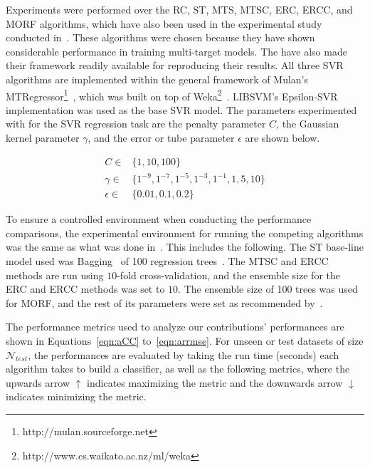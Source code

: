 \documentclass[reqno]{vcuthesis}
\numberwithin{equation}{chapter}
\begin{document}
Experiments were performed over the RC, ST, MTS, MTSC, ERC, ERCC, and MORF algorithms, which have also been used in the experimental study conducted in~\cite{Spyromitros2014}. These algorithms were chosen because they have shown considerable performance in training multi-target models. The have also made their framework readily available for reproducing their results. All three SVR algorithms are implemented within the general framework of Mulan's MTRegressor\footnote{http://mulan.sourceforge.net}~\cite{mulan}, which was built on top of Weka\footnote{http://www.cs.waikato.ac.nz/ml/weka}~\cite{Hall2009}. LIBSVM's Epsilon-SVR~\cite{CC01a} implementation was used as the base SVR model. The parameters experimented with for the SVR regression task are the penalty parameter $C$, the Gaussian kernel parameter $\gamma$, and the error or tube parameter $\epsilon$ are shown below.

\begin{subequations}
\begin{align*}
C \in  & \{1, 10, 100\} \\
\gamma \in  & \{1^{-9}, 1^{-7}, 1^{-5}, 1^{-3}, 1^{-1}, 1, 5, 10\} \\
\epsilon \in  & \{0.01, 0.1, 0.2\} 
\end{align*}
\end{subequations}

To ensure a controlled environment when conducting the performance comparisons, the experimental environment for running the competing algorithms was the same as what was done in~\cite{Spyromitros2014}. This includes the following. The ST base-line model used was Bagging~\cite{Breiman1996} of 100 regression trees~\cite{Wu2015430}. The MTSC and ERCC methods are run using $10$-fold cross-validation, and the ensemble size for the ERC and ERCC methods was set to $10$. The ensemble size of 100 trees was used for MORF, and the rest of its parameters were set as recommended by~\cite{Kocev2013}.

The performance metrics used to analyze our contributions' performances are shown in Equations~\ref{eqn:aCC} to~\ref{eqn:arrmse}. For unseen or test datasets of size $\mathcal N_{test}$, the performances are evaluated by taking the run time (seconds) each algorithm takes to build a classifier, as well as the following metrics, where the upwards arrow $\uparrow$ indicates maximizing the metric and the downwards arrow $\downarrow$ indicates minimizing the metric.
\end{document}
